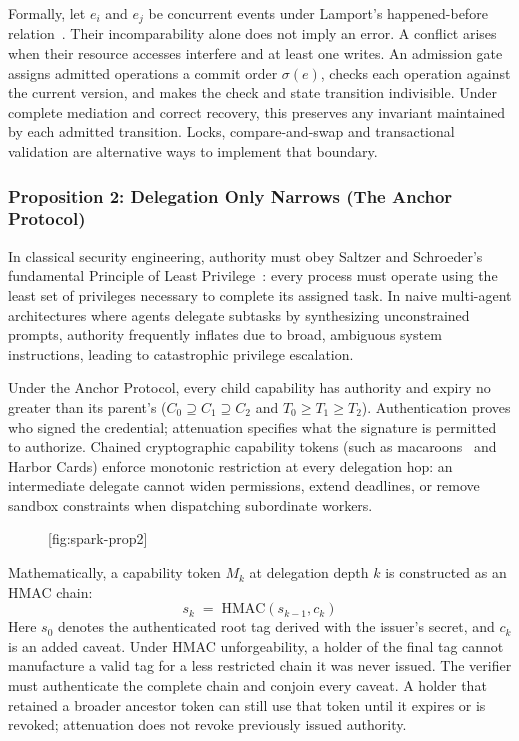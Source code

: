 \documentclass[11pt,a4paper]{article}
\providecommand{\pdchapref}[2]{\textbf{#2}}
\begin{document}
Formally, let $e_i$ and $e_j$ be concurrent events under Lamport's happened-before relation~. Their incomparability alone does not imply an error. A conflict arises when their resource accesses interfere and at least one writes. An admission gate assigns admitted operations a commit order $\sigma(e)$, checks each operation against the current version, and makes the check and state transition indivisible. Under complete mediation and correct recovery, this preserves any invariant maintained by each admitted transition. Locks, compare-and-swap and transactional validation are alternative ways to implement that boundary.

\subsubsection*{Proposition 2: Delegation Only Narrows (\pdchapref{anchor}{The Anchor Protocol})}
In classical security engineering, authority must obey Saltzer and Schroeder's fundamental Principle of Least Privilege~: every process must operate using the least set of privileges necessary to complete its assigned task. In naive multi-agent architectures where agents delegate subtasks by synthesizing unconstrained prompts, authority frequently inflates due to broad, ambiguous system instructions, leading to catastrophic privilege escalation.

Under the Anchor Protocol, every child capability has authority and expiry no greater than its parent's ($C_0 \supseteq C_1 \supseteq C_2$ and $T_0 \ge T_1 \ge T_2$). Authentication proves who signed the credential; attenuation specifies what the signature is permitted to authorize. Chained cryptographic capability tokens (such as macaroons~ and Harbor Cards) enforce monotonic restriction at every delegation hop: an intermediate delegate cannot widen permissions, extend deadlines, or remove sandbox constraints when dispatching subordinate workers.

\begin{figure}[tp]
  \centering
  [fig:spark-prop2]
\end{figure}

Mathematically, a capability token $M_k$ at delegation depth $k$ is constructed as an HMAC chain:
\begin{equation}
s_k \;=\; \mathrm{HMAC}(s_{k-1}, c_k)
\end{equation}
Here $s_0$ denotes the authenticated root tag derived with the issuer's secret, and $c_k$ is an added caveat. Under HMAC unforgeability, a holder of the final tag cannot manufacture a valid tag for a less restricted chain it was never issued. The verifier must authenticate the complete chain and conjoin every caveat. A holder that retained a broader ancestor token can still use that token until it expires or is revoked; attenuation does not revoke previously issued authority.
\end{document}
